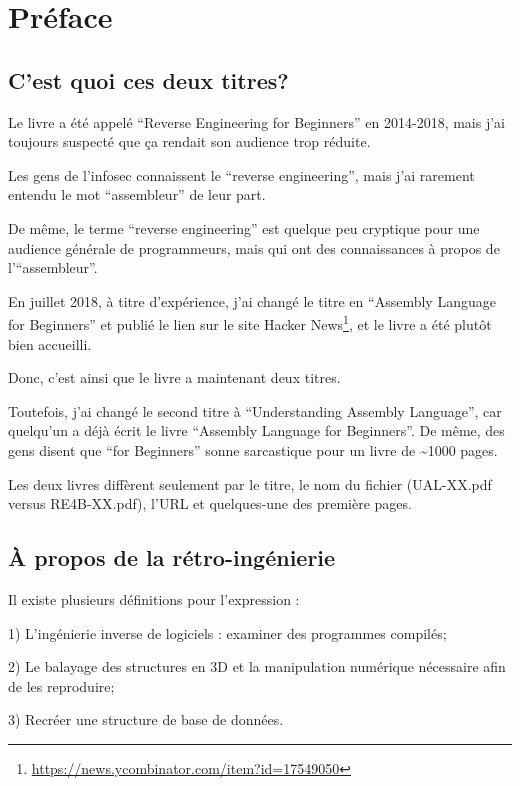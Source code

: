 \section*{Préface}

\subsection*{C'est quoi ces deux titres?}
\label{TwoTitles}

Le livre a été appelé ``Reverse Engineering for Beginners'' en 2014-2018, mais j'ai
toujours suspecté que ça rendait son audience trop réduite.

Les gens de l'infosec connaissent le ``reverse engineering'', mais j'ai rarement
entendu le mot ``assembleur'' de leur part.

De même, le terme ``reverse engineering'' est quelque peu cryptique pour une audience
générale de programmeurs, mais qui ont des connaissances à propos de l'``assembleur''.

En juillet 2018, à titre d'expérience, j'ai changé le titre en ``Assembly Language for Beginners''
et publié le lien sur le site Hacker News\footnote{\url{https://news.ycombinator.com/item?id=17549050}},
et le livre a été plutôt bien accueilli.

Donc, c'est ainsi que le livre a maintenant deux titres.

Toutefois, j'ai changé le second titre à ``Understanding Assembly Language'', car
quelqu'un a déjà écrit le livre ``Assembly Language for Beginners''.
De même, des gens disent que ``for Beginners'' sonne sarcastique pour un livre de
\textasciitilde{}1000 pages.

Les deux livres diffèrent seulement par le titre, le nom du fichier (UAL-XX.pdf versus
RE4B-XX.pdf), l'URL et quelques-une des première pages.

\subsection*{À propos de la rétro-ingénierie}

Il existe plusieurs définitions pour l'expression  :

1) L'ingénierie inverse de logiciels : examiner des programmes compilés;

2) Le balayage des structures en 3D et la manipulation numérique nécessaire afin de les reproduire;

3) Recréer une structure de base de données.

